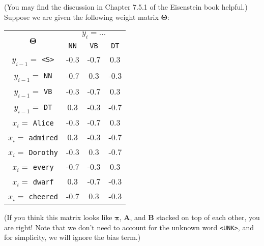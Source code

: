 \documentclass[11pt,letterpaper]{article}
\begin{document}
(You may find the discussion in Chapter 7.5.1 of the Eisenstein book helpful.)\\

\noindent Suppose we are given the following weight matrix $\mathbf{\Theta}$:
\begin{center}
\begin{tabular}{|c|c|c|c|}
\hline 
\multirow{2}{*}{$\mathbf{\Theta}$} & \multicolumn{3}{|c|}{$y_i=\ldots$} \\ 
\cline{2-4}
& \texttt{NN} & \texttt{VB} & \texttt{DT} \\ 
\hline 
$y_{i-1}=$ \texttt{<S>} & -0.3 & -0.7 & 0.3 \\ 
\hhline{|=|=|=|=|}
$y_{i-1}=$ \texttt{NN} & -0.7 & 0.3 & -0.3 \\ 
\hline 
$y_{i-1}=$ \texttt{VB} & -0.3 & -0.7 & 0.3 \\ 
\hline 
$y_{i-1}=$ \texttt{DT} & 0.3 & -0.3 & -0.7 \\ 
\hhline{|=|=|=|=|}
$x_i=$ \texttt{Alice} & -0.3 & -0.7 & 0.3 \\ 
\hline 
$x_i=$ \texttt{admired} & 0.3 & -0.3 & -0.7 \\ 
\hline 
$x_i=$ \texttt{Dorothy} & -0.3 & 0.3 & -0.7 \\ 
\hline 
$x_i=$ \texttt{every} & -0.7 & -0.3 & 0.3 \\ 
\hline 
$x_i=$ \texttt{dwarf} & 0.3 & -0.7 & -0.3 \\ 
\hline 
$x_i=$ \texttt{cheered} & -0.7 & 0.3 & -0.3 \\ 
\hline 
\end{tabular} 
\end{center}

\noindent (If you think this matrix looks like $\mathbf{\pi}$, $\mathbf{A}$, and $\mathbf{B}$ stacked on top of each other, you are right! Note that we don't need to account for the unknown word \texttt{<UNK>}, and for simplicity, we will ignore the bias term.)
\end{document}
